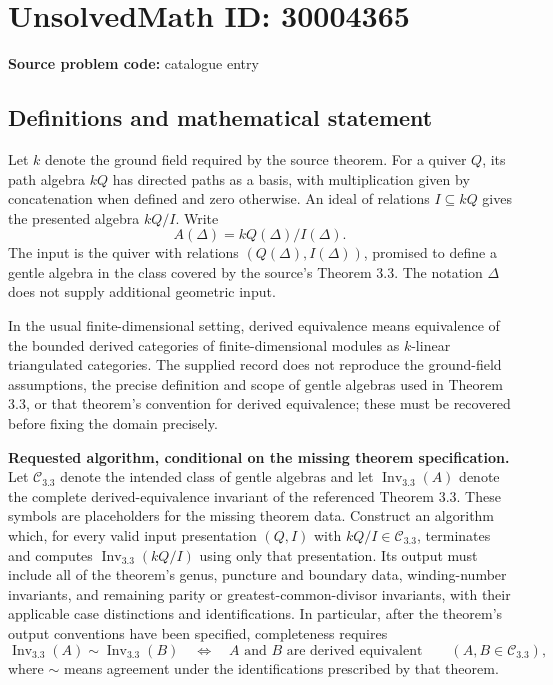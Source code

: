 \documentclass[11pt]{article}
\begin{document}
\section*{UnsolvedMath ID: 30004365}
\textbf{Source problem code:} catalogue entry
\subsection{Definitions and mathematical statement}
Let \(k\) denote the ground field required by the source theorem. For a quiver \(Q\), its path algebra \(kQ\) has directed paths as a basis, with multiplication given by concatenation when defined and zero otherwise. An ideal of relations \(I\subseteq kQ\) gives the presented algebra \(kQ/I\). Write
\[
A(\Delta)=kQ(\Delta)/I(\Delta).
\]
The input is the quiver with relations \((Q(\Delta),I(\Delta))\), promised to define a gentle algebra in the class covered by the source's Theorem 3.3. The notation \(\Delta\) does not supply additional geometric input.

In the usual finite-dimensional setting, derived equivalence means equivalence of the bounded derived categories of finite-dimensional modules as \(k\)-linear triangulated categories. The supplied record does not reproduce the ground-field assumptions, the precise definition and scope of gentle algebras used in Theorem 3.3, or that theorem's convention for derived equivalence; these must be recovered before fixing the domain precisely.

\textbf{Requested algorithm, conditional on the missing theorem specification.} Let \(\mathcal C_{3.3}\) denote the intended class of gentle algebras and let \(\operatorname{Inv}_{3.3}(A)\) denote the complete derived-equivalence invariant of the referenced Theorem 3.3. These symbols are placeholders for the missing theorem data. Construct an algorithm which, for every valid input presentation \((Q,I)\) with \(kQ/I\in\mathcal C_{3.3}\), terminates and computes \(\operatorname{Inv}_{3.3}(kQ/I)\) using only that presentation. Its output must include all of the theorem's genus, puncture and boundary data, winding-number invariants, and remaining parity or greatest-common-divisor invariants, with their applicable case distinctions and identifications. In particular, after the theorem's output conventions have been specified, completeness requires
\[
\operatorname{Inv}_{3.3}(A)\sim\operatorname{Inv}_{3.3}(B)
\quad\Longleftrightarrow\quad
A\text{ and }B\text{ are derived equivalent}
\qquad(A,B\in\mathcal C_{3.3}),
\]
where \(\sim\) means agreement under the identifications prescribed by that theorem.
\end{document}
